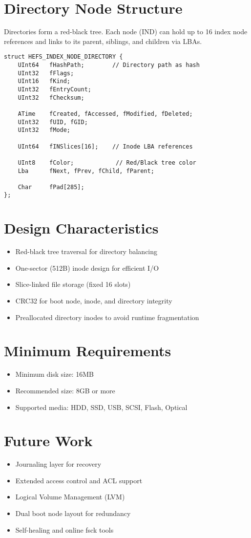 \documentclass{article}
\begin{document}
\section{Directory Node Structure}
Directories form a red-black tree. Each node (IND) can hold up to 16 index node references and links to its parent, siblings, and children via LBAs.

\begin{lstlisting}[style=cstyle, caption={HEFS\_INDEX\_NODE\_DIRECTORY}]
struct HEFS_INDEX_NODE_DIRECTORY {
    UInt64   fHashPath;        // Directory path as hash
    UInt32   fFlags;
    UInt16   fKind;
    UInt32   fEntryCount;
    UInt32   fChecksum;

    ATime    fCreated, fAccessed, fModified, fDeleted;
    UInt32   fUID, fGID;
    UInt32   fMode;

    UInt64   fINSlices[16];    // Inode LBA references

    UInt8    fColor;            // Red/Black tree color
    Lba      fNext, fPrev, fChild, fParent;

    Char     fPad[285];
};
\end{lstlisting}

\section{Design Characteristics}

\begin{itemize}
    \item Red-black tree traversal for directory balancing
    \item One-sector (512B) inode design for efficient I/O
    \item Slice-linked file storage (fixed 16 slots)
    \item CRC32 for boot node, inode, and directory integrity
    \item Preallocated directory inodes to avoid runtime fragmentation
\end{itemize}

\section{Minimum Requirements}

\begin{itemize}
    \item Minimum disk size: 16MB
    \item Recommended size: 8GB or more
    \item Supported media: HDD, SSD, USB, SCSI, Flash, Optical
\end{itemize}

\section{Future Work}
\begin{itemize}
    \item Journaling layer for recovery
    \item Extended access control and ACL support
    \item Logical Volume Management (LVM)
    \item Dual boot node layout for redundancy
    \item Self-healing and online fsck tools
\end{itemize}
\end{document}
